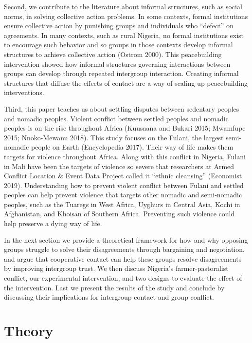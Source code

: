 \documentclass[11pt]{article}
\begin{document}
Second, we contribute to the literature about informal structures, such
as social norms, in solving collective action problems. In some
contexts, formal institutions ensure collective action by punishing
groups and individuals who ``defect'' on agreements. In many contexts,
such as rural Nigeria, no formal institutions exist to encourage such
behavior and so groups in those contexts develop informal structures to
achieve collective action (Ostrom 2000). This peacebuilding intervention
showed how informal structures governing interactions between groups can
develop through repeated intergroup interaction. Creating informal
structures that diffuse the effects of contact are a way of scaling up
peacebuilding interventions.

Third, this paper teaches us about settling disputes between sedentary
peoples and nomadic peoples. Violent conflict between settled peoples
and nomadic peoples is on the rise throughout Africa (Kuusaana and
Bukari 2015; Mwamfupe 2015; Nnoko-Mewanu 2018). This study focuses on
the Fulani, the largest semi-nomadic people on Earth (Encyclopedia
2017). Their way of life makes them targets for violence throughout
Africa. Along with this conflict in Nigeria, Fulani in Mali have been
the targets of violence so severe that researchers at Armed Conflict
Location \& Event Data Project called it ``ethnic cleansing'' (Economist
2019). Understanding how to prevent violent conflict between Fulani and
settled peoples can help prevent violence that targets other nomadic and
semi-nomadic peoples, such as the Tuaregs in West Africa, Uyghurs in
Central Asia, Kochi in Afghanistan, and Khoisan of Southern Africa.
Preventing such violence could help preserve a dying way of life.

In the next section we provide a theoretical framework for how and why
opposing groups struggle to solve their disagreements through bargaining
and negotiation, and argue that cooperative contact can help these
groups resolve disagreements by improving intergroup trust. We then
discuss Nigeria's farmer-pastoralist conflict, our experimental
intervention, and two designs to evaluate the effect of the
intervention. Last we present the results of the study and conclude by
discussing their implications for intergroup contact and group conflict.

\hypertarget{theory}{%
\section{Theory}\label{theory}}
\end{document}
